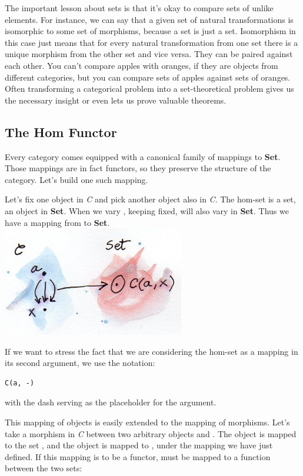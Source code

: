 The important lesson about sets is that it's okay to compare sets of
unlike elements. For instance, we can say that a given set of natural
transformations is isomorphic to some set of morphisms, because a set is
just a set. Isomorphism in this case just means that for every natural
transformation from one set there is a unique morphism from the other
set and vice versa. They can be paired against each other. You can't
compare apples with oranges, if they are objects from different
categories, but you can compare sets of apples against sets of oranges.
Often transforming a categorical problem into a set-theoretical problem
gives us the necessary insight or even lets us prove valuable theorems.

\subsection{The Hom Functor}\label{the-hom-functor}

Every category comes equipped with a canonical family of mappings to
\textbf{Set}. Those mappings are in fact functors, so they preserve the
structure of the category. Let's build one such mapping.

Let's fix one object  in \emph{C} and pick another object
 also in \emph{C}. The hom-set  is a set, an
object in \textbf{Set}. When we vary , keeping 
fixed,  will also vary in \textbf{Set}. Thus we have a
mapping from  to \textbf{Set}.\\
\includegraphics[width=3.12500in]{images/hom-set.jpg}

If we want to stress the fact that we are considering the hom-set as a
mapping in its second argument, we use the notation:

\begin{verbatim}
C(a, -)
\end{verbatim}

with the dash serving as the placeholder for the argument.

This mapping of objects is easily extended to the mapping of morphisms.
Let's take a morphism  in \emph{C} between two arbitrary
objects  and . The object  is mapped to
the set , and the object  is mapped to
, under the mapping we have just defined. If this
mapping is to be a functor,  must be mapped to a function
between the two sets:

